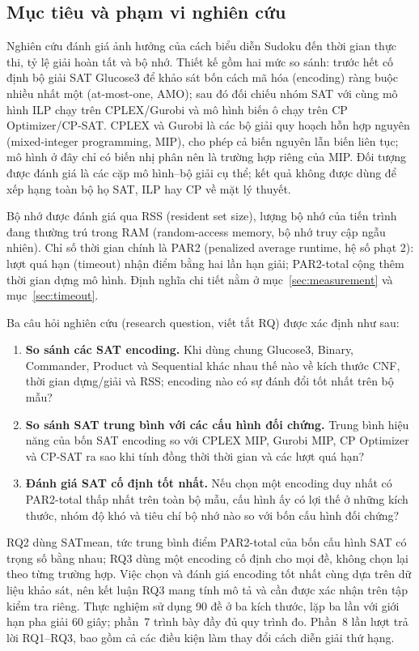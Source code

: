 \documentclass[a4paper]{cas-sc}
\begin{document}
\subsection{Mục tiêu và phạm vi nghiên cứu}
Nghiên cứu đánh giá ảnh hưởng của cách biểu diễn Sudoku đến thời gian thực thi, tỷ lệ giải hoàn tất và bộ nhớ. Thiết kế gồm hai mức so sánh: trước hết cố định bộ giải SAT Glucose3 để khảo sát bốn cách mã hóa (encoding) ràng buộc nhiều nhất một (at-most-one, AMO); sau đó đối chiếu nhóm SAT với cùng mô hình ILP chạy trên CPLEX/Gurobi và mô hình biến ô chạy trên CP Optimizer/CP-SAT. CPLEX và Gurobi là các bộ giải quy hoạch hỗn hợp nguyên (mixed-integer programming, MIP), cho phép cả biến nguyên lẫn biến liên tục; mô hình ở đây chỉ có biến nhị phân nên là trường hợp riêng của MIP. Đối tượng được đánh giá là các cặp mô hình--bộ giải cụ thể; kết quả không được dùng để xếp hạng toàn bộ họ SAT, ILP hay CP về mặt lý thuyết.

Bộ nhớ được đánh giá qua RSS (resident set size), lượng bộ nhớ của tiến trình đang thường trú trong RAM (random-access memory, bộ nhớ truy cập ngẫu nhiên). Chỉ số thời gian chính là PAR2 (penalized average runtime, hệ số phạt 2): lượt quá hạn (timeout) nhận điểm bằng hai lần hạn giải; PAR2-total cộng thêm thời gian dựng mô hình. Định nghĩa chi tiết nằm ở mục~\ref{sec:measurement} và mục~\ref{sec:timeout}.

Ba câu hỏi nghiên cứu (research question, viết tắt RQ) được xác định như sau:
\begin{enumerate}[label=\textbf{RQ\arabic*.},leftmargin=3.5em,labelsep=.6em,itemsep=5pt,topsep=4pt]
\item \textbf{So sánh các SAT encoding.} Khi dùng chung Glucose3, Binary, Commander, Product và Sequential khác nhau thế nào về kích thước CNF, thời gian dựng/giải và RSS; encoding nào có sự đánh đổi tốt nhất trên bộ mẫu?
\item \textbf{So sánh SAT trung bình với các cấu hình đối chứng.} Trung bình hiệu năng của bốn SAT encoding so với CPLEX MIP, Gurobi MIP, CP Optimizer và CP-SAT ra sao khi tính đồng thời thời gian và các lượt quá hạn?
\item \textbf{Đánh giá SAT cố định tốt nhất.} Nếu chọn một encoding duy nhất có PAR2-total thấp nhất trên toàn bộ mẫu, cấu hình ấy có lợi thế ở những kích thước, nhóm độ khó và tiêu chí bộ nhớ nào so với bốn cấu hình đối chứng?
\end{enumerate}
RQ2 dùng SATmean, tức trung bình điểm PAR2-total của bốn cấu hình SAT có trọng số bằng nhau; RQ3 dùng một encoding cố định cho mọi đề, không chọn lại theo từng trường hợp. Việc chọn và đánh giá encoding tốt nhất cùng dựa trên dữ liệu khảo sát, nên kết luận RQ3 mang tính mô tả và cần được xác nhận trên tập kiểm tra riêng. Thực nghiệm sử dụng 90 đề ở ba kích thước, lặp ba lần với giới hạn pha giải 60 giây; phần~7 trình bày đầy đủ quy trình đo. Phần~8 lần lượt trả lời RQ1--RQ3, bao gồm cả các điều kiện làm thay đổi cách diễn giải thứ hạng.
\end{document}
